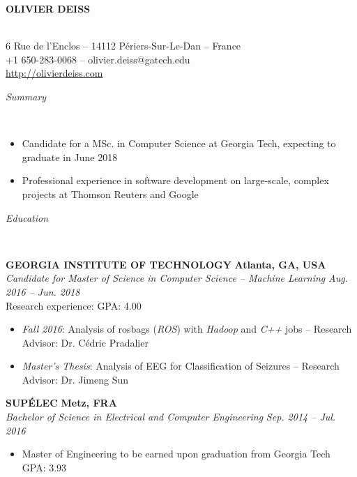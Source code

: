 \documentclass[a4paper, 12pt]{article}
\newcommand{\marginline}{-0.3cm}
\newcommand{\margincontent}{-0.6cm}
\newcommand{\margincontentnotextbefore}{-0.3cm}
\newcommand{\marginbeforesection}{0.25cm}
\newcommand{\linewidthperso}{0.02cm}
\newcommand{\styletitle}[1]{\textbf{#1}}
\newcommand{\styledesc}[1]{\textit{#1}}
\newcommand{\styleloc}[1]{\textbf{#1}}
\newcommand{\styledates}[1]{\textit{#1}}
\newcommand{\stylesection}[1]{
  \vspace{\marginbeforesection}
  \begin{normalsize}\textit{#1}\end{normalsize}
  \vspace{\marginline}\\
  \noindent\makebox[\linewidth]{\rule{\textwidth}{\linewidthperso}}

}
\begin{document}
\begin{footnotesize}

\begin{center}
  \begin{small}\textbf{OLIVIER DEISS}\end{small}\\
  6 Rue de l'Enclos -- 14112 P\'eriers-Sur-Le-Dan -- France\\
  +1 650-283-0068 -- olivier.deiss@gatech.edu\\
  \url{http://olivierdeiss.com}
\end{center}

\stylesection{Summary}

\vspace{\margincontentnotextbefore}
\begin{itemize}
  \item Candidate for a MSc. in Computer Science at Georgia Tech, expecting to graduate in June 2018
  \item Professional experience in software development on large-scale, complex projects at Thomson Reuters and Google
\end{itemize}

\stylesection{Education}

\styletitle{GEORGIA INSTITUTE OF TECHNOLOGY} \hfill \styleloc{Atlanta, GA, USA}\\
\styledesc{Candidate for Master of Science in Computer Science -- Machine Learning} \hfill \styledates{Aug. 2016 -- Jun. 2018}\\
Research experience: \hfill GPA: 4.00
\vspace{-0.15cm}
\begin{itemize}
  \item \textit{Fall 2016}: Analysis of rosbags (\textit{ROS}) with \textit{Hadoop} and \textit{C++} jobs -- Research Advisor: Dr. C\'edric Pradalier 
  \item \textit{Master's Thesis}: Analysis of EEG for Classification of Seizures -- Research Advisor: Dr. Jimeng Sun
\end{itemize}

\styletitle{SUP\'ELEC} \hfill \styleloc{Metz, FRA}\\
\styledesc{Bachelor of Science in Electrical and Computer Engineering} \hfill \styledates{Sep. 2014 -- Jul. 2016}\\
\vspace{\margincontent}
\begin{itemize}
  \item Master of Engineering to be earned upon graduation from Georgia Tech \hfill GPA: 3.93
\end{itemize}


\end{footnotesize}
\end{document}
